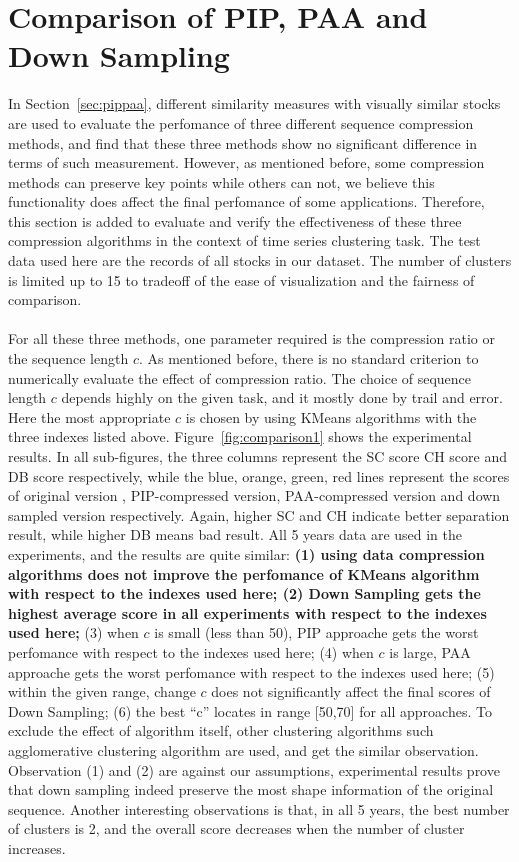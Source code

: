 \section{Comparison of PIP, PAA and Down Sampling}
In Section~\ref{sec:pippaa}, different similarity measures with visually similar stocks are used to evaluate the perfomance of three different sequence compression methods, and find that these three methods show no significant difference in terms of such measurement. However, as mentioned before, some compression methods can preserve key points while others can not, we believe this functionality does affect the final perfomance of some applications.  Therefore, this section is added to evaluate and verify the effectiveness of these three compression algorithms in the context of time series clustering task. The test data used here are the records of all stocks in our dataset. The number of clusters is limited up to 15 to tradeoff of the ease of visualization and the fairness of comparison.\\
\\For all these three methods, one parameter required is the compression ratio or the sequence length $c$. As mentioned before, there is no standard criterion to numerically evaluate the effect of compression ratio. The choice of sequence length $c$ depends highly on the given task, and it mostly done by trail and error. Here the most appropriate $c$ is chosen by using KMeans algorithms with the three indexes listed above. Figure~\ref{fig:comparison1} shows the experimental results. In all sub-figures, the three columns represent the SC score CH score and DB score respectively, while the blue, orange, green, red lines represent the scores of original version , PIP-compressed version, PAA-compressed version and down sampled version respectively. Again, higher SC and CH indicate better separation result, while higher DB means bad result. All 5 years data are used in the experiments, and the results are quite similar: \textbf{(1) using data compression algorithms does not improve the perfomance of KMeans algorithm with respect to the indexes used here; (2) Down Sampling gets the highest average score in all experiments with respect to the indexes used here;} (3) when $c$ is small (less than 50), PIP approache gets the worst perfomance with respect to the indexes used here; (4) when $c$ is large, PAA approache gets the worst perfomance with respect to the indexes used here; (5) within the given range, change $c$ does not significantly affect the final scores of Down Sampling; (6) the best ``c'' locates in range [50,70] for all approaches. To exclude the effect of algorithm itself, other clustering algorithms such agglomerative clustering algorithm are used, and get the similar observation. Observation (1) and (2) are against our assumptions, experimental results prove that down sampling indeed preserve the most shape information of the original sequence. Another interesting observations is that, in all 5 years, the best number of clusters is 2, and the overall score decreases when the number of cluster increases. 

